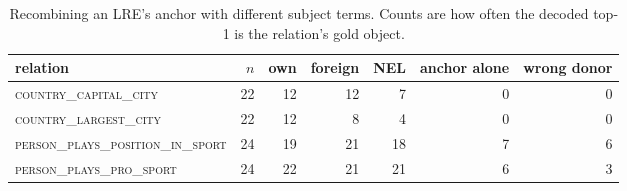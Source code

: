 \begin{table}[t]
\centering
\caption{Recombining an LRE's anchor with different subject terms. Counts are how often the decoded top-1 is the relation's gold object.}
\label{tab:swap}
\begin{tabular}{lrrrrrr}
\toprule
relation & $n$ & own & foreign & NEL & anchor alone & wrong donor \\
\midrule
\textsc{country\_capital\_city} & 22 & 12 & 12 & 7 & 0 & 0 \\
\textsc{country\_largest\_city} & 22 & 12 & 8 & 4 & 0 & 0 \\
\textsc{person\_plays\_position\_in\_sport} & 24 & 19 & 21 & 18 & 7 & 6 \\
\textsc{person\_plays\_pro\_sport} & 24 & 22 & 21 & 21 & 6 & 3 \\
\bottomrule
\end{tabular}
\end{table}
